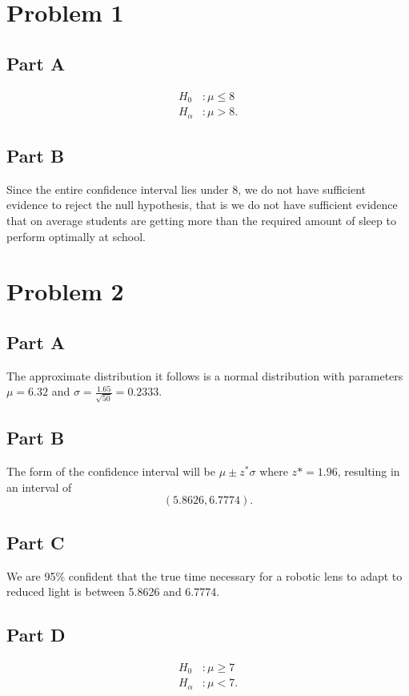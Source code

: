 \documentclass[12pt]{extarticle}
\begin{document}
\section*{Problem 1}
\subsection*{Part A}
\begin{align*}
	H_0 &: \mu \leq 8 \\
	H_\alpha &: \mu > 8
.\end{align*}

\subsection*{Part B}
Since the entire confidence interval lies under 8, we do not have sufficient evidence to reject the null hypothesis, that is we do not have sufficient evidence that on average students are getting more than the required amount of sleep to perform optimally at school.

\section*{Problem 2}
\subsection*{Part A}
The approximate distribution it follows is a normal distribution with parameters $\mu = 6.32$ and $\sigma = \frac{1.65}{\sqrt{50}} = 0.2333$.

\subsection*{Part B}
The form of the confidence interval will be $\mu \pm z^* \sigma$ where $z* = 1.96$, resulting in an interval of
\[
	(5.8626, 6.7774)
.\]

\subsection*{Part C}
We are 95\% confident that the true time necessary for a robotic lens to adapt to reduced light is between 5.8626 and 6.7774.

\subsection*{Part D}
\begin{align*}
	H_0 &: \mu \geq 7 \\
	H_\alpha &: \mu < 7
.\end{align*}
\end{document}
